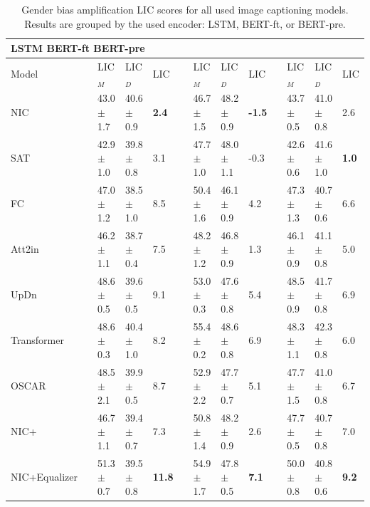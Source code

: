     \begin{table}[H]
    \begin{adjustbox}{width=\columnwidth,center}
  \begin{tabular}{@{}lllllllllllll@{}}
    \toprule
    \multicolumn{13}{l}{\hspace{4.5cm}LSTM \hspace{4cm}BERT-ft \hspace{4cm}BERT-pre} 
       \\ \midrule 
 Model &  & LIC$_{M}$ & LIC$_{D}$ &  LIC &  & LIC$_{M}$ & LIC$_{D}$ &  LIC &   & LIC$_{M}$ & LIC$_{D}$ &  LIC   \\ \midrule 
 
NIC           &  & 43.0 $\pm$ 1.7  & 40.6 $\pm$ 0.9 & \color[HTML]{32CB00} \textbf{2.4} &  & 46.7 $\pm$ 1.5  & 48.2 $\pm$ 0.9 & \color[HTML]{32CB00} \textbf{-1.5} &  & 43.7 $\pm$ 0.5  & 41.0 $\pm$ 0.8 & 2.6  \\		

SAT           &  & 42.9 $\pm$ 1.0  & 39.8 $\pm$ 0.8 & 3.1  &  & 47.7 $\pm$ 1.0  & 48.0 $\pm$ 1.1 & -0.3  &  & 42.6 $\pm$ 0.6  & 41.6 $\pm$ 1.0 & \color[HTML]{32CB00} \textbf{1.0}  \\	

FC           &  & 47.0 $\pm$ 1.2  & 38.5 $\pm$ 1.0 & 8.5  &  & 50.4 $\pm$ 1.6  & 46.1 $\pm$ 0.9 & 4.2   &  & 47.3 $\pm$ 1.3  & 40.7 $\pm$ 0.6 & 6.6  \\	

Att2in           &  & 46.2 $\pm$ 1.1  & 38.7 $\pm$ 0.4 & 7.5  &  & 48.2 $\pm$ 1.2  & 46.8 $\pm$ 0.9 & 1.3  &  & 46.1 $\pm$ 0.9  & 41.1 $\pm$ 0.8 & 5.0 \\	

UpDn           &  & 48.6 $\pm$ 0.5  & 39.6 $\pm$ 0.5 & 9.1   &  & 53.0 $\pm$ 0.3  & 47.6 $\pm$ 0.8 & 5.4  &  & 48.5 $\pm$ 0.9  & 41.7 $\pm$ 0.8 & 6.9\\	

Transformer           &  & 48.6 $\pm$ 0.3  & 40.4 $\pm$ 1.0 & 8.2  &  & 55.4 $\pm$ 0.2  & 48.6 $\pm$ 0.8 & 6.9  &  & 48.3 $\pm$ 1.1  & 42.3 $\pm$ 0.8 & 6.0  \\

OSCAR           &  & 48.5 $\pm$ 2.1  & 39.9 $\pm$ 0.5 & 8.7  &  & 52.9 $\pm$ 2.2  & 47.7 $\pm$ 0.7 & 5.1 &  & 47.7 $\pm$ 1.5  & 41.0 $\pm$ 0.8 & 6.7 \\	

NIC+           &  & 46.7 $\pm$ 1.1  & 39.4 $\pm$ 0.7 & 7.3  &  & 50.8 $\pm$ 1.4  & 48.2 $\pm$ 0.9 & 2.6 &  & 47.7 $\pm$ 0.5  & 40.7 $\pm$ 0.8 & 7.0   \\
NIC+Equalizer           &  & 51.3 $\pm$ 0.7  & 39.5 $\pm$ 0.8 & \color[HTML]{CB0000} \textbf{11.8}  &  & 54.9 $\pm$ 1.7  & 47.8 $\pm$ 0.5 & \color[HTML]{CB0000} \textbf{7.1}  &  & 50.0 $\pm$ 0.8  & 40.8 $\pm$ 0.6 & \color[HTML]{CB0000} \textbf{9.2}\\		

\bottomrule
    \end{tabular}
    \end{adjustbox}
    \caption{Gender bias amplification LIC scores for all used image captioning models. Results are grouped by the used encoder: LSTM, BERT-ft, or BERT-pre.}
    \label{table:gender}
    \end{table}

